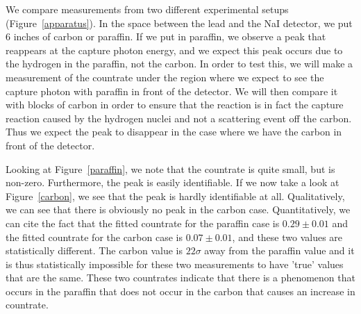 \documentclass{article}
\begin{document}
  \hspace{.25cm}

  We compare measurements from two different experimental setups (Figure~\ref{apparatus}).  In the space between the lead and the NaI detector, we put 6 inches of carbon or paraffin.  If we put in paraffin, we observe a peak that reappears at the capture photon energy, and we expect this peak occurs due to the hydrogen in the paraffin, not the carbon.  In order to test this, we will make a measurement of the countrate under the region where we expect to see the capture photon with paraffin in front of the detector.  We will then compare it with blocks of carbon in order to ensure that the reaction is in fact the capture reaction caused by the hydrogen nuclei and not a scattering event off the carbon.  Thus we expect the peak to disappear in the case where we have the carbon in front of the detector.

  \hspace{.25cm}

  Looking at Figure~\ref{paraffin}, we note that the countrate is quite small, but is non-zero.  Furthermore, the peak is easily identifiable.  If we now take a look at Figure~\ref{carbon}, we see that the peak is hardly identifiable at all.  Qualitatively, we can see that there is obviously no peak in the carbon case.  Quantitatively, we can cite the fact that the fitted countrate for the paraffin case is $0.29 \pm 0.01$ and the fitted countrate for the carbon case is $0.07 \pm 0.01$, and these two values are statistically different.  The carbon value is $22\sigma$ away from the paraffin value and it is thus statistically impossible for these two measurements to have 'true' values that are the same.  These two countrates indicate that there is a phenomenon that occurs in the paraffin that does not occur in the carbon that causes an increase in countrate.

  \hspace{.25cm}
\end{document}
